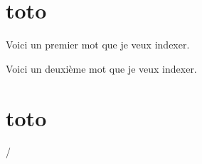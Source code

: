 \documentclass{book}
\begin{document}
\section{toto}
\begin{pages}

\begin{Leftside}  
  \beginnumbering
  \pstart
  Voici un premier mot que je veux indexer.
  \pend
  \endnumbering
\end{Leftside}

\begin{Rightside}
  \beginnumbering
  \pstart
  \label{la}Voici un deuxième mot que je veux indexer.
  \pend
  \endnumbering
\end{Rightside}

\end{pages}

\Pages
\section{toto}
\pageref{la}/

\printindex[mots]
\tableofcontents

\end{document}

